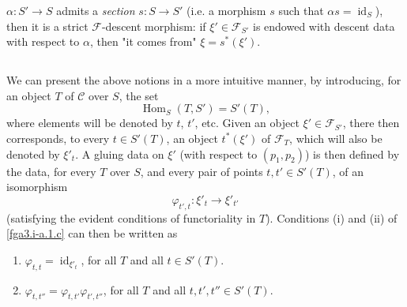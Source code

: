   \(\alpha \colon  S'\to  S\) admits a \emph{section} \(s\colon  S\to  S'\) (i.e. a morphism \(s\) such that \(\alpha  s=\operatorname {id}_S\)), then it is a strict \(\mathcal {F}\)-descent morphism:
  if \(\xi '\in \mathcal {F}_{S'}\) is endowed with descent data with respect to \(\alpha \), then "it comes from" \(\xi =s^*(\xi ')\).\subsection{}\label{fga3.i-a.1.d}\par{}We can present the above notions in a more intuitive manner, by introducing, for an object \(T\) of \(\mathcal {C}\) over \(S\), the set
  \[     \operatorname {Hom}_S(T,S') = S'(T),   \]
  where elements will be denoted by \(t\), \(t'\), etc.
  Given an object \(\xi '\in \mathcal {F}_{S'}\), there then corresponds, to every \(t\in  S'(T)\), an object \(t^*(\xi ')\) of \(\mathcal {F}_T\), which will also be denoted by \(\xi '_t\).
  A gluing data on \(\xi '\) (with respect to \((p_1,p_2)\)) is then defined by the data, for every \(T\) over \(S\), and every pair of points \(t,t'\in  S'(T)\), of an isomorphism
  \[     \varphi _{t',t}\colon  \xi '_t \to  \xi '_{t'}   \]
  (satisfying the evident conditions of functoriality in \(T\)).
  Conditions (i) and (ii) of \cref{fga3.i-a.1.c} can then be written as
  
  
 \begin{enumerate}
    
 \item[i bis.]
      
      \(\varphi _{t,t}=\operatorname {id}_{\xi '_t}\), for all \(T\) and all \(t\in  S'(T)\).
    


    
 \item[ii bis.]
      \(\varphi _{t,t''}=\varphi _{t,t'}\varphi _{t',t''}\), for all \(T\) and all \(t,t',t''\in  S'(T)\).
    

  \end{enumerate}


